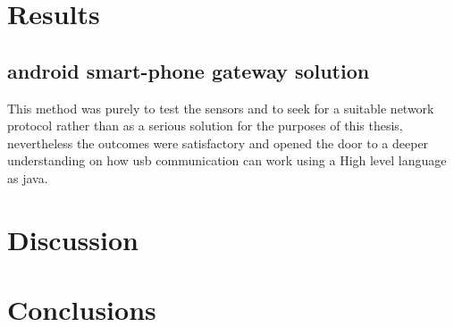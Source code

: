 \documentclass[hidelinks,11pt,a4paper,oneside,article]{memoir}
\numberwithin{equation}{chapter}
\begin{document}
\chapter{Results}
\section{android smart-phone gateway solution}
This method was purely to test the sensors and to seek for a suitable network protocol rather than as a serious solution for the purposes of this thesis, nevertheless the outcomes were satisfactory and opened the door to a deeper understanding on how \gls{usb} communication can work using a High level language as \gls{java}.



\chapter{Discussion}



\chapter{Conclusions}







\begin{flushleft}
\begin{singlespacing}

\end{singlespacing}
\end{flushleft}

\label{LastPage}~
\end{document}
